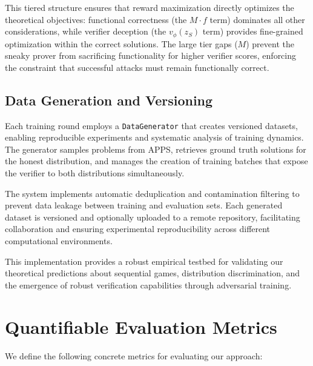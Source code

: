 This tiered structure ensures that reward maximization directly optimizes the theoretical objectives: functional correctness (the $M \cdot f$ term) dominates all other considerations, while verifier deception (the $v_\phi(z_S)$ term) provides fine-grained optimization within the correct solutions. The large tier gaps ($M$) prevent the sneaky prover from sacrificing functionality for higher verifier scores, enforcing the constraint that successful attacks must remain functionally correct.

\subsection{Data Generation and Versioning}

Each training round employs a \texttt{DataGenerator} that creates versioned datasets, enabling reproducible experiments and systematic analysis of training dynamics. The generator samples problems from APPS, retrieves ground truth solutions for the honest distribution, and manages the creation of training batches that expose the verifier to both distributions simultaneously.

The system implements automatic deduplication and contamination filtering to prevent data leakage between training and evaluation sets. Each generated dataset is versioned and optionally uploaded to a remote repository, facilitating collaboration and ensuring experimental reproducibility across different computational environments.

This implementation provides a robust empirical testbed for validating our theoretical predictions about sequential games, distribution discrimination, and the emergence of robust verification capabilities through adversarial training.

\section{Quantifiable Evaluation Metrics}
We define the following concrete metrics for evaluating our approach:

